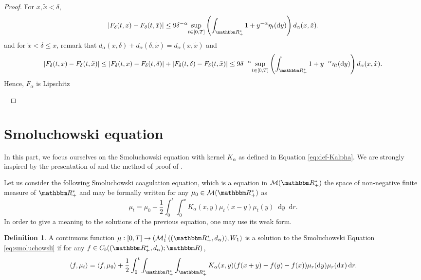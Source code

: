 \documentclass[a4paper,11pt, reqno]{amsart}
\newcommand{\cM}{\mathcal{M}}	\newcommand{\MM}{\mathbbm{M}}
\newcommand{\dd}{\mathop{}\!\mathrm{d}}
\newcommand{\1}{\mathbbm{1}}
\theoremstyle{plain}
\theoremstyle{definition}
\newtheorem{definition}[theorem]{Definition}
\begin{document}
\begin{proof}
  For $x, \tilde{x} < \delta$,
  \[ | F_{\delta} (t, x) - F_{\delta} (t, \tilde{x}) | \le 9 \delta^{-
     \alpha} \underset{t \in [0, T]}{\sup} \left( \int_{\RR_+^{\ast}} 1
     + y^{- \alpha} \eta_t (\dd y) \right) d_{\alpha} (x, \tilde{x}) . \]
  and for $\tilde{x} < \delta \le x$, remark that $d_{\alpha} (x,
  \delta) + d_{\alpha} (\delta, \tilde{x}) = d_{\alpha} (x, \tilde{x})$ and
  \[ | F_{\delta} (t, x) - F_{\delta} (t, \tilde{x}) | \le | F_{\delta}
     (t, x) - F_{\delta} (t, \delta) | + | F_{\delta} (t, \delta) - F_{\delta}
     (t, \tilde{x}) | \le 9 \delta^{- \alpha} \underset{t \in [0,
     T]}{\sup} \left( \int_{\RR_+^{\ast}} 1 + y^{- \alpha} \eta_t
     (\dd y) \right) d_{\alpha} (x, \tilde{x}) . \]
  Hence, $F_{\alpha}$ is Lipschitz
  
  \ 
\end{proof}




\section{Smoluchowski equation}

In this part, we focus ourselves on the Smoluchowski equation with kernel
$K_{\alpha}$ as defined in Equation \eqref{eq:def-Kalpha}. We are strongly
inspired by the presentation of {\cite{kolokoltsovCentralLimitTheorem2008}}
and the method of proof of
{\cite{norrisSmoluchowskisCoagulationEquation1999}}.

Let us consider the following Smoluchowski coagulation equation, which is a
equation in $\cM (\RR_+^{\ast})$ the space of non-negative
finite measure of $\RR_+^{\ast}$ and may be formally written for any
$\mu_0 \in \cM (\RR_+^{\ast})$ as
\begin{equation}
  \mu_t = \mu_0 + \frac{1}{2} \int_0^t \int_0^x K_{\alpha} (x, y) \mu_t (x -
  y) \mu_t (y) \dd y \dd r. \label{eq:smoluchowsli}
\end{equation}
In order to give a meaning to the solutions of the previous equation, one may
use its weak form.

\begin{definition}
  A continuous function $\mu : [0, T] \rightarrow (\cM_1^+
  ((\RR_+^{\ast}, d_{\alpha})), W_1)$ is a solution to the Smoluchowski
  Equation \eqref{eq:smoluchowsli} if for any $f \in C_b
  ((\RR_+^{\ast}, d_{\alpha}) ; \RR)$,
  \begin{equation}
    \langle f, \mu_t \rangle = \langle f, \mu_0 \rangle + \frac{1}{2} \int_0^t
    \int_{\RR_+^{\ast}} \int_{\RR_+^{\ast}} K_{\alpha} (x, y) (f
    (x + y) - f (y) - f (x)) \mu_r (\dd y) \mu_r (\dd x) \dd r.
    \label{eq:smolu-weak}
  \end{equation}
\end{definition}
\end{document}
